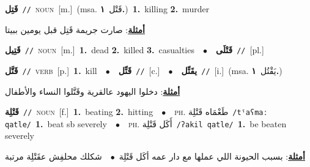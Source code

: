 \documentclass[10pt,a4paper,twoside]{article} %
\begin{document}
\begin{multicols}{2}
{\setlength\topsep{0pt}\textbf{\foreignlanguage{arabic}{قَتِل}}\ {\color{gray}\texttt{//}\color{black}}\ \textsc{noun}\ [m.]\ \color{gray}(msa. \foreignlanguage{arabic}{قَتْل}~\foreignlanguage{arabic}{\textbf{١.}})\color{black}\ \textbf{1.}~killing  \textbf{2.}~murder\  \begin{flushright}\color{gray}\foreignlanguage{arabic}{\textbf{\underline{\foreignlanguage{arabic}{أمثلة}}}: صارت جريمة قَتِل قبل يومين ببيتا}\end{flushright}\color{black}} \vspace{2mm}

{\setlength\topsep{0pt}\textbf{\foreignlanguage{arabic}{قَتِيل}}\ {\color{gray}\texttt{//}\color{black}}\ \textsc{noun}\ [m.]\ \textbf{1.}~dead  \textbf{2.}~killed  \textbf{3.}~casualties\ \ $\bullet$\ \ \setlength\topsep{0pt}\textbf{\foreignlanguage{arabic}{قَتْلَى}}\ {\color{gray}\texttt{//}\color{black}}\ [pl.]\ } \vspace{2mm}

{\setlength\topsep{0pt}\textbf{\foreignlanguage{arabic}{قَتَّل}}\ {\color{gray}\texttt{//}\color{black}}\ \textsc{verb}\ [p.]\ \textbf{1.}~kill\ \ $\bullet$\ \ \setlength\topsep{0pt}\textbf{\foreignlanguage{arabic}{قَتِّل}}\ {\color{gray}\texttt{//}\color{black}}\ [c.]\ \ $\bullet$\ \ \setlength\topsep{0pt}\textbf{\foreignlanguage{arabic}{يقَتِّل}}\ {\color{gray}\texttt{//}\color{black}}\ [i.]\ \color{gray}(msa. \foreignlanguage{arabic}{يَقْتُل}~\foreignlanguage{arabic}{\textbf{١.}})\color{black}\  \begin{flushright}\color{gray}\foreignlanguage{arabic}{\textbf{\underline{\foreignlanguage{arabic}{أمثلة}}}: دخلوا اليهود عالقرية وقَتَّلوا النساء والأطفال}\end{flushright}\color{black}} \vspace{2mm}

{\setlength\topsep{0pt}\textbf{\foreignlanguage{arabic}{قَتْلِة}}\ {\color{gray}\texttt{//}\color{black}}\ \textsc{noun}\ [f.]\ \textbf{1.}~beating  \textbf{2.}~hitting\ \ $\bullet$\ \ \textsc{ph.} \color{gray} \foreignlanguage{arabic}{طَعْمَاه قَتْلِة}\color{black}\ {\color{gray}\texttt{/{\sffamily tˤaʕmaː qatle}/}\color{black}}\ \textbf{1.}~beat sb severely\ \ $\bullet$\ \ \textsc{ph.} \color{gray} \foreignlanguage{arabic}{أَكَل قَتْلِة}\color{black}\ {\color{gray}\texttt{/{\sffamily ʔakil qatle}/}\color{black}}\ \textbf{1.}~be beaten severely\  \begin{flushright}\color{gray}\foreignlanguage{arabic}{\textbf{\underline{\foreignlanguage{arabic}{أمثلة}}}: بسبب الحيونة اللي عملها مع دار عمه أكَل قَتْلِة\ $\bullet$\ \  شكلك محلفِش عقَتْلِة مرتبة}\end{flushright}\color{black}} \vspace{2mm}


\end{multicols}
\end{document}
